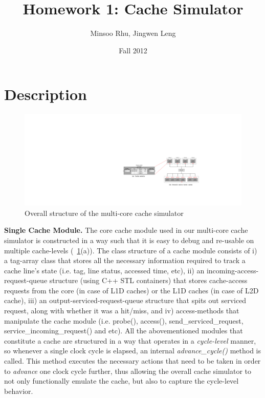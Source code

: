 \documentclass[12pt]{report}
\newcommand{\Fig}[1]{\figurename~\ref{#1}}
\begin{document}

\title{Homework 1: Cache Simulator}
\author{Minsoo Rhu, Jingwen Leng}
\date{Fall 2012}
\maketitle


\section{Description}
\begin{figure}[!h]
\begin{minipage}[b]{\textwidth}
 \centering
 \includegraphics[trim=0mm 0mm 0mm 0mm,clip,width=0.98\linewidth]{figs/cache_structure.pdf}
 \caption{Overall structure of the multi-core cache simulator}
 \label{fig:cache_structure}
\end{minipage}
\end{figure}

\textbf{Single Cache Module.} The core cache module used in our multi-core cache simulator is constructed in a way such that it is easy to debug and re-usable on multiple 
cache-levels (\Fig{fig:cache_structure}(a)). The class structure of a cache module consists of i) a tag-array
class that stores all the necessary information required to track a cache line's state (i.e. tag, line status, accessed time, etc), 
ii) an incoming-access-request-queue structure (using C++ STL containers) that stores cache-access requests from the core (in case of L1D caches) or
the L1D caches (in case of L2D cache), iii) an output-serviced-request-queue structure that spits out serviced request, along with whether
it was a hit/miss, and iv) access-methods that manipulate the cache module (i.e. probe(), access(), send\_serviced\_request, service\_incoming\_request()
and etc). All the abovementioned modules that constitute a cache are structured in a way that operates in a \emph{cycle-level} manner, 
so whenever a single clock cycle is elapsed, an internal \emph{advance\_cycle()} method is called. This method executes the necessary actions that
need to be taken in order to \emph{advance} one clock cycle further, thus allowing the overall cache simulator to not only functionally
emulate the cache, but also to capture the cycle-level behavior. 
\end{document}
